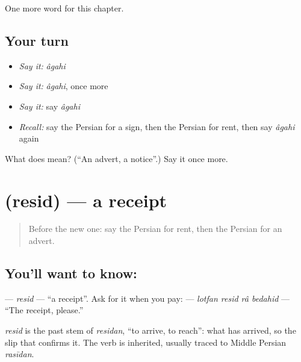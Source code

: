 \begin{grammarlens}[title={What you've built}]
One more word for this chapter.
\end{grammarlens}

\subsection*{Your turn}
\begin{itemize}
\raggedright
  \item \emph{Say it:} \emph{âgahi}
  \item \emph{Say it:} \emph{âgahi}, once more
  \item \emph{Say it:} say \emph{âgahi}
  \item \emph{Recall:} say the Persian for a sign, then the Persian for rent, then say \emph{âgahi} again
\end{itemize}

\begin{tcolorbox}[breakable,colback=teal!4,colframe=teal!35!black,title={Before you move on}]
What does  mean? (\textquotedblleft{}An advert, a notice\textquotedblright{}.) Say it once more.
\end{tcolorbox}
\section[\texorpdfstring{\fa{رسید} (resid)}{رسید (resid)}]{ (resid) — a receipt}

\label{lesson:FA-C139-resid}



\begin{quote}
Before the new one: say the Persian for rent, then the Persian for an advert.
\end{quote}

\subsection*{You'll want to know: }
\textbf{} — \emph{resid} — \textquotedblleft{}a receipt\textquotedblright{}. Ask for it when you pay: \textbf{   } — \emph{lotfan resid râ bedahid} — \textquotedblleft{}The receipt, please.\textquotedblright{}

\begin{cousinweb}
\emph{resid} is the past stem of \emph{residan}, \textquotedblleft{}to arrive, to reach\textquotedblright{}: what has arrived, so the slip that confirms it. The verb is inherited, usually traced to Middle Persian \emph{rasīdan}.
\end{cousinweb}

